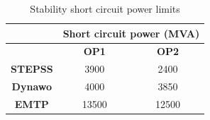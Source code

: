 \documentclass{report}
\begin{document}
\begin{table}[H]
\caption{Stability short circuit power limits}
\centering
\begin{tabular}{|c|cc|}
\hline
\multicolumn{1}{|c|}{}          & \multicolumn{2}{c|}{\textbf{Short circuit power (MVA)}}                       \\ \hline
\multicolumn{1}{|c|}{\textbf{}} & \multicolumn{1}{c|}{\textbf{OP1}} & \multicolumn{1}{c|}{\textbf{OP2}} \\ \hline
\textbf{STEPSS}                 & \multicolumn{1}{c|}{3900}        & \multicolumn{1}{c|}{2400}            \\ \hline
\textbf{Dynawo}                 & \multicolumn{1}{c|}{4000}        & \multicolumn{1}{c|}{3850}                                   \\ \hline
\textbf{EMTP}                   & \multicolumn{1}{c|}{13500}       & \multicolumn{1}{c|}{12500}                                  \\ \hline
\end{tabular}
\label{table_4VSC_SCR}
\end{table}
\end{document}

